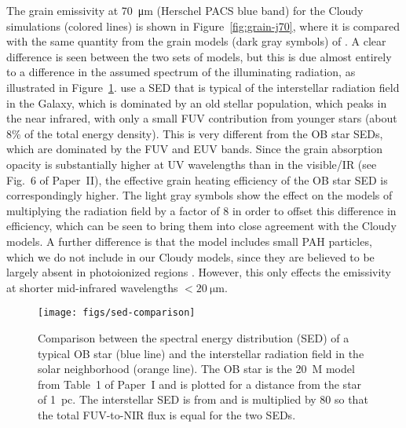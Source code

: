 \documentclass[useAMS, usenatbib, a4paper]{mnras}
\begin{document}
The grain emissivity at \SI{70}{\um} (Herschel PACS blue band) for the
Cloudy simulations (colored lines) is shown in
Figure~\ref{fig:grain-j70}, where it is compared with the same
quantity from the grain models (dark gray symbols) of
\citet{Draine:2007a}.  A clear difference is seen between the two sets
of models, but this is due almost entirely to a difference in the
assumed spectrum of the illuminating radiation, as illustrated in
Figure~\ref{fig:sed-comparison}.  \citet{Draine:2007a} use a SED that
is typical of the interstellar radiation field in the Galaxy, which is
dominated by an old stellar population, which peaks in the near
infrared, with only a small FUV contribution from younger stars (about
8\% of the total energy density).  This is very different from the OB
star SEDs, which are dominated by the FUV and EUV bands.  Since the
grain absorption opacity is substantially higher at UV wavelengths
than in the visible/IR (see Fig.~6 of Paper~II),
the effective grain heating efficiency of the OB star SED is
correspondingly higher.  The light gray symbols show the effect on the
\citet{Draine:2007a} models of multiplying the radiation field by a
factor of \num{8} in order to offset this difference in efficiency,
which can be seen to bring them into close agreement with the Cloudy
models.  A further difference is that the \citet{Draine:2007a} model
includes small PAH particles, which we do not include in our Cloudy
models, since they are believed to be largely absent in photoionized
regions \citep{Giard:1994a, Lebouteiller:2011a}.  However, this only
effects the emissivity at shorter mid-infrared wavelengths
\(< \SI{20}{\um}\).

\begin{figure}
  \centering
  \texttt{[image: figs/sed-comparison]}
  \caption{Comparison between the spectral energy distribution (SED)
    of a typical OB star (blue line) and the interstellar radiation
    field in the solar neighborhood (orange line).  The OB star is the
    \SI{20}{M_\odot} model from Table~1 of Paper~I and is plotted for
    a distance from the star of \SI{1}{pc}.  The interstellar SED is
    from \citet{Mathis:1983a} and is multiplied by \num{80} so that
    the total FUV-to-NIR flux is equal for the two SEDs.}
  \label{fig:sed-comparison}
\end{figure}
\end{document}
